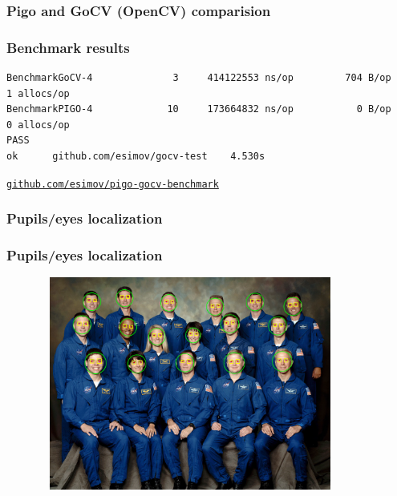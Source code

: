\documentclass[9pt]{beamer}
\newcommand{\myblue} [1] {{\color{blue}#1}}
\begin{document}
\begin{frame}[fragile]
\frametitle{Pigo and GoCV (OpenCV) comparision}


\end{frame}

\begin{frame}[fragile]
\frametitle{Benchmark results}



\begin{verbatim}
BenchmarkGoCV-4              3     414122553 ns/op         704 B/op           1 allocs/op
BenchmarkPIGO-4             10     173664832 ns/op           0 B/op           0 allocs/op
PASS
ok      github.com/esimov/gocv-test    4.530s

\end{verbatim}


\myblue{\href{https://github.com/esimov/pigo-gocv-benchmark}{\texttt{github.com/esimov/pigo-gocv-benchmark}}}


\end{frame}

\begin{frame}[fragile]
\frametitle{Pupils/eyes localization}


\end{frame}

\begin{frame}[fragile]
\frametitle{Pupils/eyes localization}


\begin{figure}[h]
\begin{center}
\includegraphics[width=10cm,height=7cm]{assets/pigo_puploc.png}
\end{center}

\end{figure}


\end{frame}
\end{document}
